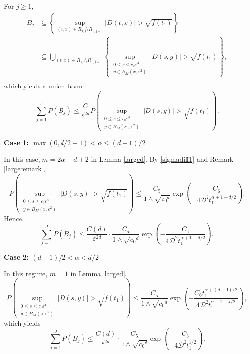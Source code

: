 \documentclass[12pt]{amsart}
\numberwithin{equation}{section}
\newcommand{\1}{\mathbf{1}}
\begin{document}
For $j\geq1$,
\begin{equation*}
\begin{split}
B_j&\subseteq \left\lbrace\sup_{(t,x)\in R_{1,j}\setminus R_{1,j-1}}\vert D(t,x)\vert>\sqrt{f(t_1)}\right\rbrace\\
&\subseteq\bigcup_{(t,x)\in R_{1,j}\setminus R_{1,j-1}}\left\lbrace\sup_{\substack{0\leq s\leq c_0\varepsilon^4\\ y\in B_M(x,\varepsilon^2)}}\vert D(s,y)\vert>\sqrt{f(t_1)}\right\rbrace,\\
\end{split}
\end{equation*}
which yields a union bound 
\begin{equation}
    \label{probB}
    \sum_{j=1}^{J}P(B_j)\leq\frac{C}{\varepsilon^{2d}}P\left(\sup_{\substack{0\leq s\leq c_0\varepsilon^4\\ y\in B_M(x_0,\varepsilon^2)}}\vert D(s,y)\vert>\sqrt{f(t_1)}\right).
\end{equation}

\textbf{Case 1: $\max(0,d/2-1)<\alpha\leq(d-1)/2$}

In this case, $m=2\alpha-d+2$ in Lemma \ref{larged}. By \eqref{sigmadiff1} and Remark \ref{largeremark},
\begin{equation*}
P\left(\sup_{\substack{0\leq s\leq c_0\varepsilon^4\\ y\in B_M(x,\varepsilon^2)}}\vert D(s,y)\vert>\sqrt{f(t_1)}\right)\leq \frac{C_5}{1\wedge \sqrt{{c_0}^d}}\exp\left(-\frac{C_6}{4\mathcal{D}^2t_1^{\alpha+1-d/2}}\right).
\end{equation*}
Hence,
\begin{equation*}
\sum_{j=1}^{J}P(B_j)
\leq\frac{C(d)}{\varepsilon^{2d}}\cdot\frac{C_5}{1\wedge \sqrt{{c_0}^d}}\exp\left(-\frac{C_6}{4\mathcal{D}^2t_1^{\alpha+1-d/2}}\right).
\end{equation*}

\textbf{Case 2: $(d-1)/2<\alpha<d/2$}

In this regime, $m=1$ in Lemma \ref{larged}.
\begin{equation*}
P\left(\sup_{\substack{0\leq s\leq c_0\varepsilon^4\\ y\in B_M(x,\varepsilon^2)}}\vert D(s,y)\vert>\sqrt{f(t_1)}\right)\leq \frac{C_5}{1\wedge \sqrt{{c_0}^d}}\exp\left(-\frac{C_6t_1^{\alpha+(d-1)/2}}{4\mathcal{D}^2t_1^{\alpha+1-d/2}}\right),
\end{equation*}
which yields
\begin{equation*}
\sum_{j=1}^{J}P(B_j)\leq\frac{C(d)}{\varepsilon^{2d}}\cdot\frac{C_5}{1\wedge \sqrt{{c_0}^d}}\exp\left(-\frac{C_6}{4\mathcal{D}^2t_1^{1/2}}\right).
\end{equation*}
\end{document}
